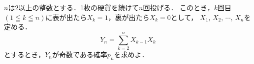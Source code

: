 \documentclass[../../main.tex]{subfiles}
\begin{document}
$n$は2以上の整数とする．1枚の硬貨を続けて$n$回投げる．
このとき，$k$回目$(1 \leqq k \leqq n)$に表が出たら$X_k=1$，裏が出たら$X_k=0$として，
$X_1, \, X_2, \, \cdots, \, X_n$を定める．
\[ Y_n=\sum_{k=2}^nX_{k-1}X_k \]
とするとき，$Y_n$が奇数である確率$p_n$を求めよ．
\end{document}
